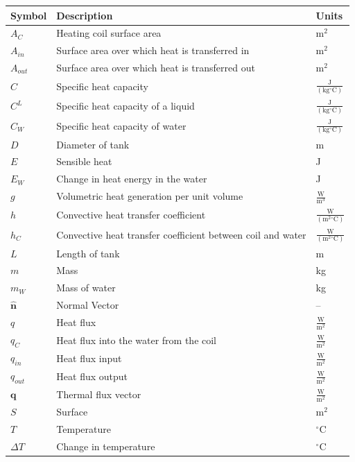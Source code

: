 \documentclass[12pt]{article}
\begin{document}
\begin{longtabu}{l X[l] l}
\toprule
\textbf{Symbol} & \textbf{Description} & \textbf{Units}
\\
\midrule
\endhead
${A_{C}}$ & Heating coil surface area & $\text{m}^{2}$
\\
${A_{in}}$ & Surface area over which heat is transferred in & $\text{m}^{2}$
\\
${A_{out}}$ & Surface area over which heat is transferred out & $\text{m}^{2}$
\\
$C$ & Specific heat capacity & $\frac{\text{J}}{(\text{kg}{}^{\circ}\text{C})}$
\\
${C^{L}}$ & Specific heat capacity of a liquid & $\frac{\text{J}}{(\text{kg}{}^{\circ}\text{C})}$
\\
${C_{W}}$ & Specific heat capacity of water & $\frac{\text{J}}{(\text{kg}{}^{\circ}\text{C})}$
\\
$D$ & Diameter of tank & m
\\
$E$ & Sensible heat & J
\\
${E_{W}}$ & Change in heat energy in the water & J
\\
$g$ & Volumetric heat generation per unit volume & $\frac{\text{W}}{\text{m}^{3}}$
\\
$h$ & Convective heat transfer coefficient & $\frac{\text{W}}{(\text{m}^{2}{}^{\circ}\text{C})}$
\\
${h_{C}}$ & Convective heat transfer coefficient between coil and water & $\frac{\text{W}}{(\text{m}^{2}{}^{\circ}\text{C})}$
\\
$L$ & Length of tank & m
\\
$m$ & Mass & kg
\\
${m_{W}}$ & Mass of water & kg
\\
$\mathbf{\hat{n}}$ & Normal Vector & --
\\
$q$ & Heat flux & $\frac{\text{W}}{\text{m}^{2}}$
\\
${q_{C}}$ & Heat flux into the water from the coil & $\frac{\text{W}}{\text{m}^{2}}$
\\
${q_{in}}$ & Heat flux input & $\frac{\text{W}}{\text{m}^{2}}$
\\
${q_{out}}$ & Heat flux output & $\frac{\text{W}}{\text{m}^{2}}$
\\
$\mathbf{q}$ & Thermal flux vector & $\frac{\text{W}}{\text{m}^{2}}$
\\
$S$ & Surface & $\text{m}^{2}$
\\
$T$ & Temperature & ${}^{\circ}$C
\\
$ΔT$ & Change in temperature & ${}^{\circ}$C

\end{longtabu}
\end{document}
